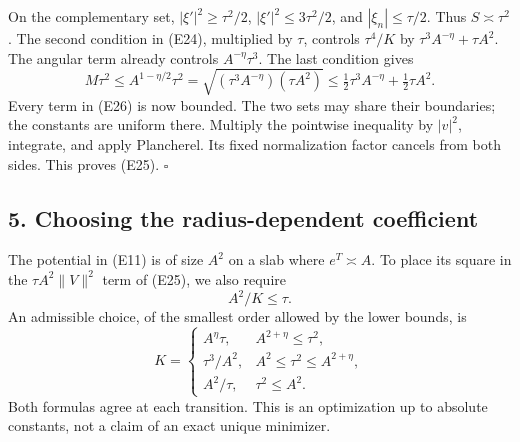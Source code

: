 \documentclass[
  11pt,
]{article}
\makeatletter
\let\ReaderOriginalAnchorStart\hyper@anchorstart
\let\ReaderOriginalAnchorEnd\hyper@anchorend
\let\ReaderPendingAliases\@empty
\def\ReaderArmAliases#1{\gdef\ReaderPendingAliases{#1}}
\def\hyper@anchorstart#1{\ReaderIfNativeAnchorTF{#1}{\ReaderPendingAliases\global\let\ReaderPendingAliases\@empty}{}\ReaderOriginalAnchorStart{#1}}
\makeatother
\begin{document}
On the complementary set, \(|\xi'|^2\geq\tau^2/2\),
\(|\xi'|^2\leq3\tau^2/2\), and \(|\xi_n|\leq\tau/2\). Thus
\(S\asymp\tau^2\). The second condition in (E24), multiplied by
\(\tau\), controls \(\tau^4/K\) by \(\tau^3A^{-\eta}+\tau A^2\). The
angular term already controls \(A^{-\eta}\tau^3\). The last condition
gives \[
 M\tau^2\leq A^{1-\eta/2}\tau^2
     =\sqrt{(\tau^3A^{-\eta})(\tau A^2)}
     \leq\tfrac12\tau^3A^{-\eta}+\tfrac12\tau A^2.                \tag{E29}
\] Every term in (E26) is now bounded. The two sets may share their
boundaries; the constants are uniform there. Multiply the pointwise
inequality by \(|\widehat v|^2\), integrate, and apply Plancherel. Its
fixed normalization factor cancels from both sides. This proves (E25).
\(\square\)

\ReaderArmAliases{\ReaderOriginalAnchorStart{AN03-EXU-005}\ReaderOriginalAnchorEnd\begingroup\expandafter\def\csname @currentHref\endcsname{AN03-EXU-005}\label{AN03-EXU-005}\endgroup\ReaderOriginalAnchorStart{an03-exu-005-choosing-the-radius-dependent-coefficient}\ReaderOriginalAnchorEnd\begingroup\expandafter\def\csname @currentHref\endcsname{an03-exu-005-choosing-the-radius-dependent-coefficient}\label{an03-exu-005-choosing-the-radius-dependent-coefficient}\endgroup\ReaderOriginalAnchorStart{5-choosing-the-radius-dependent-coefficient}\ReaderOriginalAnchorEnd\begingroup\expandafter\def\csname @currentHref\endcsname{5-choosing-the-radius-dependent-coefficient}\label{5-choosing-the-radius-dependent-coefficient}\endgroup\ReaderOriginalAnchorStart{choosing-the-radius-dependent-coefficient}\ReaderOriginalAnchorEnd}
\subsection{5. Choosing the radius-dependent
coefficient}\label{choosing-the-radius-dependent-coefficient}

The potential in (E11) is of size \(A^2\) on a slab where
\(e^T\asymp A\). To place its square in the \(\tau A^2\|V\|^2\) term of
(E25), we also require \[
                             A^2/K\leq\tau.                     \tag{E30}
\] An admissible choice, of the smallest order allowed by the lower
bounds, is \[
 K=
 \begin{cases}
  A^\eta\tau,& A^{2+\eta}\leq\tau^2,\\
  \tau^3/A^2,& A^2\leq\tau^2\leq A^{2+\eta},\\
  A^2/\tau,& \tau^2\leq A^2.
 \end{cases}                                                     \tag{E31}
\] Both formulas agree at each transition. This is an optimization up to
absolute constants, not a claim of an exact unique minimizer.
\end{document}
